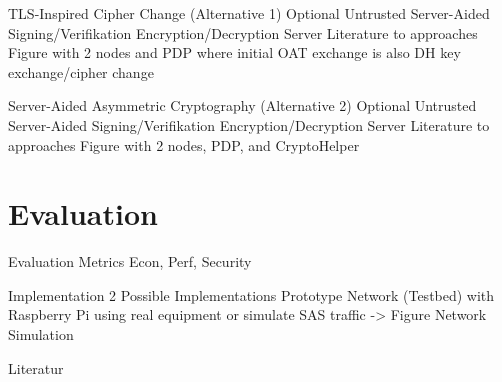 \documentclass[en]{sdqbeamer}
\begin{document}
\begin{frame}{TLS-Inspired Cipher Change (Alternative 1)}
    Optional Untrusted Server-Aided Signing/Verifikation Encryption/Decryption Server
    Literature to approaches
    Figure with 2 nodes and PDP where initial OAT exchange is also DH key exchange/cipher change
\end{frame}

\begin{frame}{Server-Aided Asymmetric Cryptography (Alternative 2)}
    Optional Untrusted Server-Aided Signing/Verifikation Encryption/Decryption Server
    Literature to approaches
    Figure with 2 nodes, PDP, and CryptoHelper
\end{frame}

\section{Evaluation}
\begin{frame}{Evaluation Metrics}
    Econ, Perf, Security
\end{frame}

\begin{frame}{Implementation}
    2 Possible Implementations
    Prototype Network (Testbed) with Raspberry Pi using real equipment or simulate SAS traffic -> Figure
    Network Simulation
\end{frame}

\appendix
\beginbackup

\begin{frame}{Literatur}
\printbibliography
\end{frame}

\backupend
\end{document}
